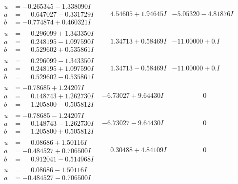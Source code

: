\documentclass[1p]{elsarticle_modified}
\theoremstyle{definition}
\begin{document}
$$\begin{array}{c|c|c}
\begin{aligned}
u &= -0.265345 - 1.338090 I \\
a &= \phantom{-}0.647027 - 0.331729 I \\
b &= -0.774874 + 0.460321 I\end{aligned}
 & \phantom{-}4.54605 + 1.94645 I & -5.05320 - 4.81876 I \\ \hline\begin{aligned}
u &= \phantom{-}0.296099 + 1.343350 I \\
a &= \phantom{-}0.248195 - 1.097590 I \\
b &= \phantom{-}0.529602 + 0.535861 I\end{aligned}
 & \phantom{-}1.34713 + 0.58469 I & -11.00000 + 0. I\phantom{ +0.000000I} \\ \hline\begin{aligned}
u &= \phantom{-}0.296099 - 1.343350 I \\
a &= \phantom{-}0.248195 + 1.097590 I \\
b &= \phantom{-}0.529602 - 0.535861 I\end{aligned}
 & \phantom{-}1.34713 - 0.58469 I & -11.00000 + 0. I\phantom{ +0.000000I} \\ \hline\begin{aligned}
u &= -0.78685 + 1.24207 I \\
a &= \phantom{-}0.148743 + 1.262730 I \\
b &= \phantom{-}1.205800 - 0.505812 I\end{aligned}
 & -6.73027 + 9.64430 I & \phantom{-0.000000 } 0 \\ \hline\begin{aligned}
u &= -0.78685 - 1.24207 I \\
a &= \phantom{-}0.148743 - 1.262730 I \\
b &= \phantom{-}1.205800 + 0.505812 I\end{aligned}
 & -6.73027 - 9.64430 I & \phantom{-0.000000 } 0 \\ \hline\begin{aligned}
u &= \phantom{-}0.08686 + 1.50116 I \\
a &= -0.484527 + 0.706500 I \\
b &= \phantom{-}0.912041 - 0.514968 I\end{aligned}
 & \phantom{-}0.30488 + 4.84109 I & \phantom{-0.000000 } 0 \\ \hline\begin{aligned}
u &= \phantom{-}0.08686 - 1.50116 I \\
a &= -0.484527 - 0.706500 I \\

\end{aligned}
\end{array}$$
\end{document}
